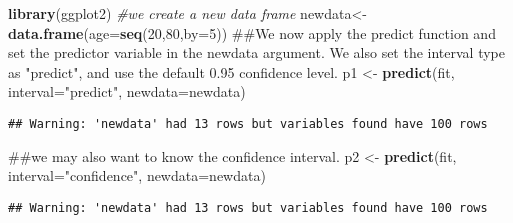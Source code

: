 \documentclass[]{book}
\newenvironment{Shaded}{\begin{snugshade}}{\end{snugshade}}
\newcommand{\KeywordTok}[1]{\textcolor[rgb]{0.13,0.29,0.53}{\textbf{#1}}}
\newcommand{\DataTypeTok}[1]{\textcolor[rgb]{0.13,0.29,0.53}{#1}}
\newcommand{\DecValTok}[1]{\textcolor[rgb]{0.00,0.00,0.81}{#1}}
\newcommand{\StringTok}[1]{\textcolor[rgb]{0.31,0.60,0.02}{#1}}
\newcommand{\CommentTok}[1]{\textcolor[rgb]{0.56,0.35,0.01}{\textit{#1}}}
\newcommand{\OperatorTok}[1]{\textcolor[rgb]{0.81,0.36,0.00}{\textbf{#1}}}
\newcommand{\NormalTok}[1]{#1}
\theoremstyle{definition}
\theoremstyle{definition}
\theoremstyle{definition}
\theoremstyle{remark}
\begin{document}
\begin{Shaded}
\begin{Highlighting}[]
\KeywordTok{library}\NormalTok{(ggplot2)}
\CommentTok{#we create a new data frame }
\NormalTok{newdata<-}\KeywordTok{data.frame}\NormalTok{(}\DataTypeTok{age=}\KeywordTok{seq}\NormalTok{(}\DecValTok{20}\NormalTok{,}\DecValTok{80}\NormalTok{,}\DataTypeTok{by=}\DecValTok{5}\NormalTok{))}
\NormalTok{##We now apply the predict function and set the predictor variable in the newdata argument. We also set the interval type as "predict", and use the default 0.95 confidence level.}
\NormalTok{p1 <-}\StringTok{ }\KeywordTok{predict}\NormalTok{(fit, }\DataTypeTok{interval=}\StringTok{"predict"}\NormalTok{, }\DataTypeTok{newdata=}\NormalTok{newdata)}
\end{Highlighting}
\end{Shaded}

\begin{verbatim}
## Warning: 'newdata' had 13 rows but variables found have 100 rows
\end{verbatim}

\begin{Shaded}
\begin{Highlighting}[]
\NormalTok{##we may also want to know the confidence interval. }
\NormalTok{p2 <-}\StringTok{ }\KeywordTok{predict}\NormalTok{(fit, }\DataTypeTok{interval=}\StringTok{"confidence"}\NormalTok{, }\DataTypeTok{newdata=}\NormalTok{newdata)}
\end{Highlighting}
\end{Shaded}

\begin{verbatim}
## Warning: 'newdata' had 13 rows but variables found have 100 rows
\end{verbatim}

\begin{Shaded}
\end{Shaded}
\end{document}
